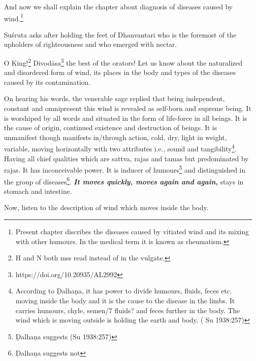 \begin{translation}

\item [1] And now we shall explain the chapter about diagnosis of
diseases caused by wind.\footnote{Present chapter discribes the diseases caused by vitiated wind and its mixing with other humours. In the medical term it is known as rheumatism.}

\item[2]

\item[3] Suśruta asks after holding the feet of Dhanvantari who is the foremost of the upholders of righteousness and who
emerged with nectar.

\item[4] O King!\footnote{ H and N both mss read instead of
 in the vulgate.} Divodāsa\footnote{https://doi.org/10.20935/AL2992} the best of the orators! Let us know about
the naturalized and disordered form of wind, its places in the body and
types of the diseases caused by its contamination.

\item[5--9ab] On hearing his words, the venerable sage replied that being
independent, constant and omnipresent this wind is revealed as self-born
and supreme being. It is worshiped by all words and situated in the form of life-force in all beings. It is the cause of origin, continued
existence and destruction of beings. It is unmanifest though manifests
in/through action, cold, dry, light in weight, variable, moving
horizontally with two attributes i.e., sound and
tangibility\footnote{According to Ḍalhaṇa, it has power to divide
humours, fluids, feces etc. moving inside the body and it is the cause to
the disease in the limbs. It carries humours, chyle, semen/7 fluids? and
feces further in the body. The wind which is moving outside is holding
the earth and body. (  Su 1938:257)}. Having all
chief qualities which are sattva, rajas and tamas but predominated by
rajas. It has inconceivable power. It is inducer of humours\footnote{
Ḍalhaṇa suggests  (Su 1938:257)} and distinguished in
the group of diseases\footnote{ Ḍalhaṇa suggests  not 
}. \emph{\textbf{It move}\textbf{s quickly, moves again and
again, }}stays in stomach and intestine.

\item[9cd] Now, listen to the description of wind which moves inside the
body.


\end{translation}
